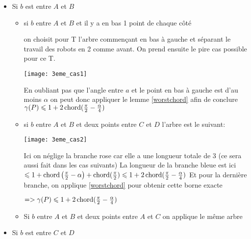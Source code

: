 \begin{itemize}

\item \label{3cas1} Si $b$ est entre $A$ et $B$

\begin{itemize}

\item \label{3cas11} si $b$ entre $A$ et $B$ et il y a en bas 1 point de chaque côté

on choisit pour T l'arbre commençant en bas à gauche et séparant le travail des robots en 2 comme avant.
On prend ensuite le pire cas possible pour ce T.

  \texttt{[image: 3eme\_cas1]}

En oubliant pas que l'angle entre $a$ et le point en bas à gauche est d'au moins $\alpha$ on peut donc appliquer le lemme \ref{worstchord} afin de conclure
$\gamma(P) \leqslant 1 + 2\operatorname{chord}(\frac{\pi}{2} - \frac{\alpha}{4})$

\item \label{3cas12} si $b$ entre $A$ et $B$ et deux points entre $C$ et $D$
l'arbre est le suivant:

  \texttt{[image: 3eme\_cas2]}

Ici on néglige la branche rose car elle a une longueur totale de 3 (ce sera aussi fait dans les cas suivants)
La longueur de la branche bleue est ici $\leqslant 1+\operatorname{chord}\left(\frac{\pi}{2} - \alpha\right)+\operatorname{chord}(\frac{\pi}{2}) \leqslant 1 + 2\operatorname{chord}(\frac{\pi}{2} - \frac{\alpha}{4})$
Et pour la dernière branche, on applique \ref{worstchord} pour obtenir cette borne exacte

$=> \gamma(P) \leqslant 1 + 2\operatorname{chord}(\frac{\pi}{2} - \frac{\alpha}{4})$

\item \label{3cas13} Si $b$ entre $A$ et $B$ et deux points entre $A$ et $C$ on applique le même arbre

\end{itemize}

\item \label{3cas2} Si $b$ est entre $C$ et $D$

\begin{itemize}


\end{itemize}
\end{itemize}
